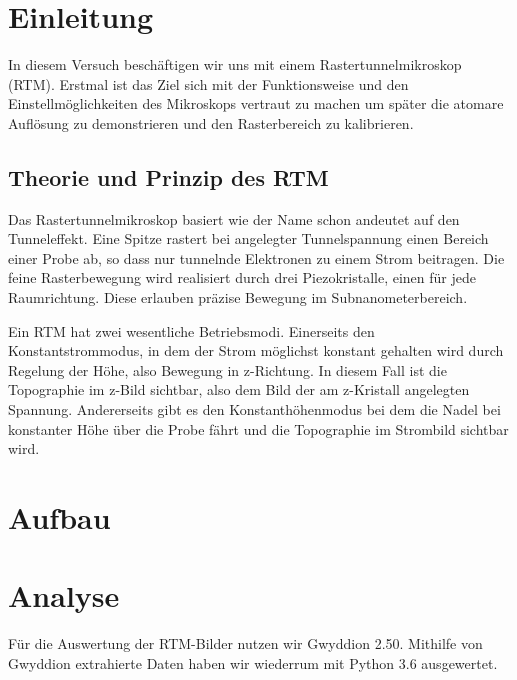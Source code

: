 \tableofcontents
\newpage
\listoffigures

\listoftables

\skippage

\setcounter{page}{1}
\restoregeometry
\thispagestyle{fancy}


\section{Einleitung}

In diesem Versuch beschäftigen wir uns mit einem Rastertunnelmikroskop (RTM). Erstmal ist das Ziel sich mit der Funktionsweise und den Einstellmöglichkeiten des Mikroskops vertraut zu machen um später die atomare Auflösung zu demonstrieren und den Rasterbereich zu kalibrieren.

\subsection{Theorie und Prinzip des RTM}

Das Rastertunnelmikroskop basiert wie der Name schon andeutet auf den Tunneleffekt. Eine Spitze rastert bei angelegter Tunnelspannung einen Bereich einer Probe ab, so dass nur tunnelnde Elektronen zu einem Strom beitragen. Die feine Rasterbewegung wird realisiert durch drei Piezokristalle, einen für jede Raumrichtung. Diese erlauben präzise Bewegung im Subnanometerbereich.

Ein RTM hat zwei wesentliche Betriebsmodi. Einerseits den Konstantstrommodus, in dem der Strom möglichst konstant gehalten wird durch Regelung der Höhe, also Bewegung in z-Richtung. In diesem Fall ist die Topographie im z-Bild sichtbar, also dem Bild der am z-Kristall angelegten Spannung. Andererseits gibt es den Konstanthöhenmodus bei dem die Nadel bei konstanter Höhe über die Probe fährt und die Topographie im Strombild sichtbar wird.

\section{Aufbau}



\section{Analyse}
Für die Auswertung der RTM-Bilder nutzen wir Gwyddion 2.50. Mithilfe von Gwyddion extrahierte Daten haben wir wiederrum mit Python 3.6 ausgewertet. 

